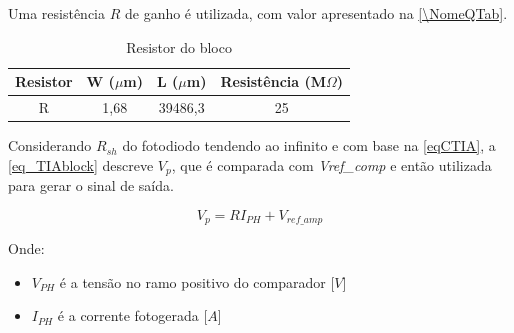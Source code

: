 Uma resist\^encia $R$ de ganho \'e utilizada, com valor apresentado na \autoref{\NomeQTab}.

\begin{table}[htb]
\caption{Resistor do bloco \NomeBloco}
\label{\NomeQTab}
\centering
\begin{tabular}{cccc}
\toprule
Resistor & W ($\mu$m)  & L ($\mu$m) & Resist\^encia (M$\Omega$)\\
\midrule \midrule
R & 1,68 & 39486,3 & 25\\
\bottomrule
\end{tabular}
\end{table}

Considerando $R_{sh}$ do fotodiodo tendendo ao infinito e com base na \autoref{eqCTIA}, a \autoref{eq_TIAblock} descreve $V_{p}$, que \'e comparada com \textit{Vref\_comp} e então utilizada para gerar o sinal de sa\'ida.

\begin{equation}
    \label{eq_TIAblock}
    V_{p} = RI_{PH} + V_{ref\_amp}
\end{equation}

Onde:

\begin{itemize}

    \item \textit{$V_{PH}$} \'e a tensão no ramo positivo do comparador [$V$]
    \item \textit{$I_{PH}$} \'e a corrente fotogerada [$A$]
    
\end{itemize}